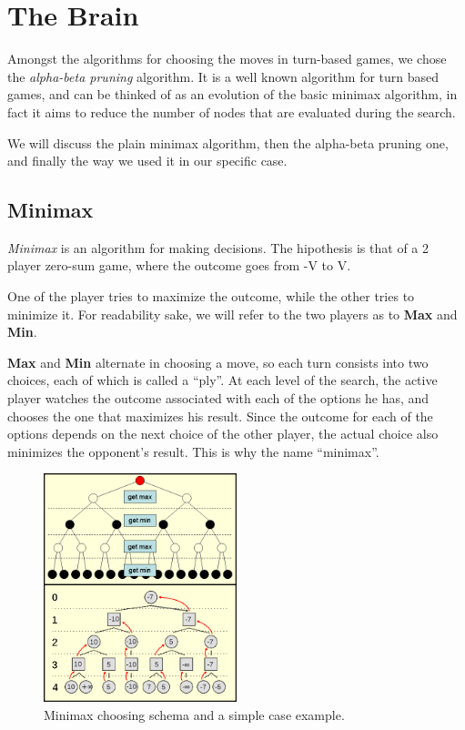 \chapter{The Brain}
Amongst the algorithms for choosing the moves in turn-based games, we chose the \textit{alpha-beta pruning} algorithm.
It is a well known algorithm for turn based games, and can be thinked of as an evolution of the basic minimax algorithm, in fact it aims to reduce the number of nodes that are evaluated during the search.

We will discuss the plain minimax algorithm, then the alpha-beta pruning one, and finally the way we used it in our specific case.

\section{Minimax} \label{sec:minimax}
\textit{Minimax} is an algorithm for making decisions.
The hipothesis is that of a 2 player zero-sum game, where the outcome goes from -V to V.

One of the player tries to maximize the outcome, while the other tries to minimize it.
For readability sake, we will refer to the two players as to \textbf{Max} and \textbf{Min}.

\textbf{Max} and \textbf{Min} alternate in choosing a move, so each turn consists into two choices, each of which is called a ``ply''.
At each level of the search, the active player watches the outcome associated with each of the options he has, and chooses the one that maximizes his result.
Since the outcome for each of the options depends on the next choice of the other player, the actual choice also minimizes the opponent's result.
This is why the name ``minimax''.\\

\begin{figure}[htbp]
  \centering
    \includegraphics[width=0.5\textwidth]{images/minimax.png}
  \caption{Minimax choosing schema and a simple case example.}
\end{figure}

